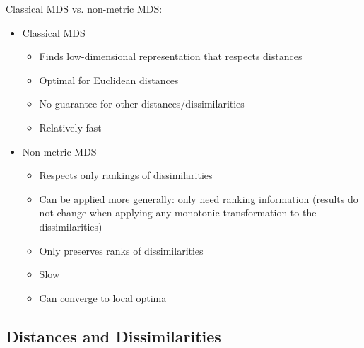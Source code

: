 \documentclass[a4paper]{article}
\begin{document}
Classical MDS vs. non-metric MDS:
\begin{itemize}
    \item Classical MDS
    \begin{itemize}
        \item Finds low-dimensional representation that respects distances
        \item Optimal for Euclidean distances
        \item No guarantee for other distances/dissimilarities
        \item Relatively fast
    \end{itemize}
    \item Non-metric MDS
    \begin{itemize}
        \item Respects only rankings of dissimilarities
        \item Can be applied more generally: only need ranking information (results do not change when applying any monotonic transformation to the dissimilarities)
        \item Only preserves ranks of dissimilarities
        \item Slow
        \item Can converge to local optima
    \end{itemize}
\end{itemize}

\subsection{Distances and Dissimilarities}
\end{document}
